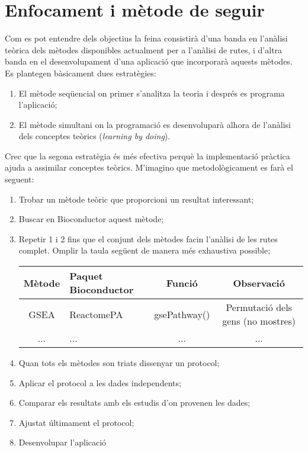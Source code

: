 \documentclass[]{article}
\begin{document}
\section{Enfocament i mètode de seguir}

Com es pot entendre dels objectius la feina consistirà d'una banda en l'anàlisi teòrica dels mètodes disponibles actualment per a l'anàlisi de rutes, i d'altra banda en el desenvolupament d'una aplicació que incorporarà aquests mètodes. Es plantegen bàsicament dues estratègies: 
\begin{enumerate}
\item El mètode seqüencial on primer s'analitza la teoria i després es programa l'aplicació; 
\item El mètode simultani on la programació es desenvoluparà alhora de l'anàlisi dels conceptes teòrics (\textit{learning by doing}).
\end{enumerate}

Crec que la segona estratègia és més efectiva perquè la implementació pràctica ajuda a assimilar conceptes teòrics. 
M'imagino que metodològicament es farà el seguent:
\begin{enumerate}
\item Trobar un mètode teòric que proporcioni un resultat interessant;
\item Buscar en Bioconductor aquest mètode;
\item Repetir 1 i 2 fins que el conjunt dels mètodes facin l'anàlisi de les rutes complet. Omplir la taula següent de manera més exhaustiva possible;
\begin{center}
 \begin{tabular}{||c | l | c | c||} 
 \hline
 Mètode & Paquet Bioconductor & Funció & Observació \\ [0.5ex] 
 \hline\hline
 GSEA & ReactomePA & gsePathway() & Permutació dels gens (no mostres) \\ 
 \hline
 ... & ... & ... &... \\[1ex] 
 \hline
\end{tabular}
\end{center}

\item Quan tots els mètodes son triats dissenyar un protocol;
\item Aplicar el protocol a les dades independents;
\item Comparar els resultats amb els estudis d'on provenen les dades;
\item Ajustat últimament el protocol;
\item Desenvolupar l'aplicació
\end{enumerate}
 
\end{document}
